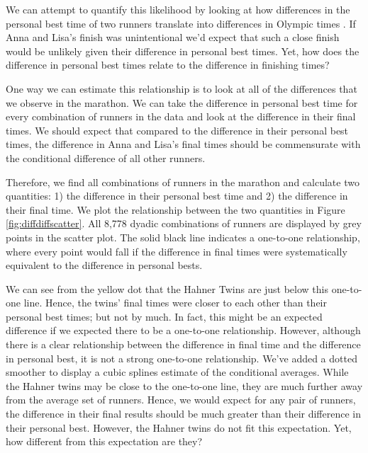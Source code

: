 \documentclass[12pt,titlepage]{article}
\begin{document}
We can attempt to quantify this likelihood by looking at how differences in the personal best time of two runners translate into differences in Olympic times .  If Anna and Lisa's finish was unintentional we'd expect that such a close finish would be unlikely given their difference in personal best times.   Yet, how does the difference in personal best times relate to the difference in finishing times?

One way we can estimate this relationship is to look at all of the differences that we observe in the marathon.  We can take the difference in personal best time for every combination of runners in the data and look at the difference in their final times.  We should expect that compared to the difference in their personal best times, the difference in Anna and Lisa's final times should be commensurate with the conditional difference of all other runners. %

Therefore, we find all combinations of runners in the marathon and calculate two quantities: 1) the difference in their personal best time and 2) the difference in their final time. We plot the relationship between the two quantities in Figure \ref{fig:diffdiffscatter}.   All 8,778 dyadic combinations of runners are displayed by grey points in the scatter plot.   The solid black line indicates a one-to-one relationship, where every point would fall if the difference in final times were systematically equivalent to the difference in personal bests.  



We can see from the yellow dot that the Hahner Twins are just below this one-to-one line.  Hence, the twins' final times were closer to each other than their personal best times; but not by much.  In fact, this might be an expected difference if we expected there to be a one-to-one relationship.     However, although there is a clear relationship between the difference in final time and the difference in personal best, it is not a strong one-to-one relationship.  We've added a dotted smoother to display a cubic splines estimate of the conditional averages.  While the Hahner twins may be close to the one-to-one line, they are much further away from the average set of runners.  Hence, we would expect for any pair of runners, the difference in their final results should be much greater than their difference in their personal best.  However, the Hahner twins do not fit this expectation.   Yet, how different from this expectation are they?
\end{document}
